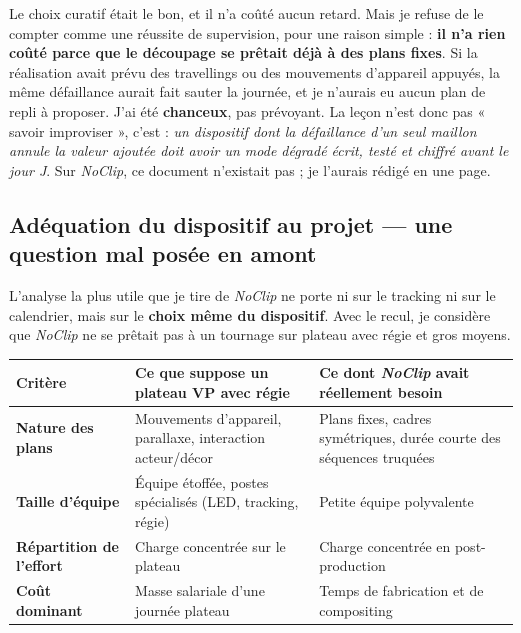 \documentclass[11pt,a4paper]{report}
\begin{document}
\begin{infobox}[title={Ce que je retiens de cet épisode --- sans me féliciter}]
Le choix curatif était le bon, et il n'a coûté aucun retard. Mais je refuse de le compter comme
une réussite de supervision, pour une raison simple : \textbf{il n'a rien coûté parce que le
découpage se prêtait déjà à des plans fixes}. Si la réalisation avait prévu des travellings ou des
mouvements d'appareil appuyés, la même défaillance aurait fait sauter la journée, et je
n'aurais eu aucun plan de repli à proposer. J'ai été \textbf{chanceux}, pas prévoyant. La leçon
n'est donc pas « savoir improviser », c'est : \emph{un dispositif dont la défaillance d'un seul
maillon annule la valeur ajoutée doit avoir un mode dégradé écrit, testé et chiffré avant le jour
J}. Sur \textit{NoClip}, ce document n'existait pas ; je l'aurais rédigé en une page.
\end{infobox}

\subsection{Adéquation du dispositif au projet --- une question mal posée en amont}
L'analyse la plus utile que je tire de \textit{NoClip} ne porte ni sur le tracking ni sur le calendrier,
mais sur le \textbf{choix même du dispositif}. Avec le recul, je considère que \textit{NoClip} ne
se prêtait pas à un tournage sur plateau avec régie et gros moyens.

\begin{center}
\small
\begin{tabularx}{\textwidth}{>{\bfseries}p{3.5cm} Y Y}
\toprule
{}\textbf{Critère} & \textbf{Ce que suppose un plateau VP avec régie} & \textbf{Ce dont \textit{NoClip} avait réellement besoin} \\
\midrule
Nature des plans & Mouvements d'appareil, parallaxe, interaction acteur/décor & Plans fixes, cadres symétriques, durée courte des séquences truquées \\
Taille d'équipe & Équipe étoffée, postes spécialisés (LED, tracking, régie) & Petite équipe polyvalente \\
Répartition de l'effort & Charge concentrée sur le plateau & Charge concentrée en post-production \\
Coût dominant & Masse salariale d'une journée plateau & Temps de fabrication et de compositing \\
\bottomrule
\end{tabularx}
\end{center}
\end{document}
